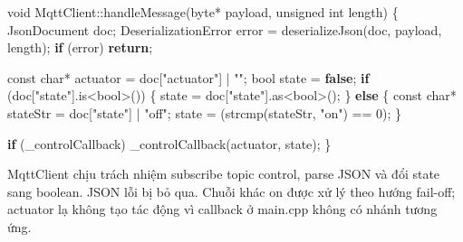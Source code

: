 \documentclass[11pt,oneside,openany]{book}
\renewcommand{\texttt}[1]{{\ttfamily\small #1}}
\newenvironment{Shaded}{\begin{snugshade}}{\end{snugshade}}
\newcommand{\AttributeTok}[1]{\textcolor[rgb]{0.16,0.50,0.73}{#1}}
\newcommand{\ControlFlowTok}[1]{\textcolor[rgb]{0.99,0.74,0.29}{\textbf{#1}}}
\newcommand{\DataTypeTok}[1]{\textcolor[rgb]{0.16,0.50,0.73}{#1}}
\newcommand{\DecValTok}[1]{\textcolor[rgb]{0.96,0.45,0.00}{#1}}
\newcommand{\KeywordTok}[1]{\textcolor[rgb]{0.81,0.81,0.76}{\textbf{#1}}}
\newcommand{\NormalTok}[1]{\textcolor[rgb]{0.81,0.81,0.76}{#1}}
\newcommand{\OperatorTok}[1]{\textcolor[rgb]{0.81,0.81,0.76}{#1}}
\newcommand{\StringTok}[1]{\textcolor[rgb]{0.96,0.31,0.31}{#1}}
\renewenvironment{Shaded}{%
  \def\FrameCommand{\fboxsep=8pt\colorbox{shadecolor}}%
  \MakeFramed{\advance\hsize-\width\FrameRestore}%
}{\endMakeFramed}
\begin{document}
\begin{Shaded}
\begin{Highlighting}[]
\DataTypeTok{void}\NormalTok{ MqttClient}\OperatorTok{::}\NormalTok{handleMessage}\OperatorTok{(}\NormalTok{byte}\OperatorTok{*}\NormalTok{ payload}\OperatorTok{,} \DataTypeTok{unsigned} \DataTypeTok{int}\NormalTok{ length}\OperatorTok{)} \OperatorTok{\{}
\NormalTok{  JsonDocument doc}\OperatorTok{;}
\NormalTok{  DeserializationError error }\OperatorTok{=}\NormalTok{ deserializeJson}\OperatorTok{(}\NormalTok{doc}\OperatorTok{,}\NormalTok{ payload}\OperatorTok{,}\NormalTok{ length}\OperatorTok{);}
  \ControlFlowTok{if} \OperatorTok{(}\NormalTok{error}\OperatorTok{)} \ControlFlowTok{return}\OperatorTok{;}

  \AttributeTok{const} \DataTypeTok{char}\OperatorTok{*}\NormalTok{ actuator }\OperatorTok{=}\NormalTok{ doc}\OperatorTok{[}\StringTok{"actuator"}\OperatorTok{]} \OperatorTok{|} \StringTok{""}\OperatorTok{;}
  \DataTypeTok{bool}\NormalTok{ state }\OperatorTok{=} \KeywordTok{false}\OperatorTok{;}
  \ControlFlowTok{if} \OperatorTok{(}\NormalTok{doc}\OperatorTok{[}\StringTok{"state"}\OperatorTok{].}\NormalTok{is}\OperatorTok{\textless{}}\DataTypeTok{bool}\OperatorTok{\textgreater{}())} \OperatorTok{\{}
\NormalTok{    state }\OperatorTok{=}\NormalTok{ doc}\OperatorTok{[}\StringTok{"state"}\OperatorTok{].}\NormalTok{as}\OperatorTok{\textless{}}\DataTypeTok{bool}\OperatorTok{\textgreater{}();}
  \OperatorTok{\}} \ControlFlowTok{else} \OperatorTok{\{}
    \AttributeTok{const} \DataTypeTok{char}\OperatorTok{*}\NormalTok{ stateStr }\OperatorTok{=}\NormalTok{ doc}\OperatorTok{[}\StringTok{"state"}\OperatorTok{]} \OperatorTok{|} \StringTok{"off"}\OperatorTok{;}
\NormalTok{    state }\OperatorTok{=} \OperatorTok{(}\NormalTok{strcmp}\OperatorTok{(}\NormalTok{stateStr}\OperatorTok{,} \StringTok{"on"}\OperatorTok{)} \OperatorTok{==} \DecValTok{0}\OperatorTok{);}
  \OperatorTok{\}}

  \ControlFlowTok{if} \OperatorTok{(}\NormalTok{\_controlCallback}\OperatorTok{)}\NormalTok{ \_controlCallback}\OperatorTok{(}\NormalTok{actuator}\OperatorTok{,}\NormalTok{ state}\OperatorTok{);}
\OperatorTok{\}}
\end{Highlighting}
\end{Shaded}

\texttt{MqttClient} chịu trách nhiệm subscribe topic control, parse JSON
và đổi state sang boolean. JSON lỗi bị bỏ qua. Chuỗi khác \texttt{on}
được xử lý theo hướng fail-off; actuator lạ không tạo tác động vì
callback ở \texttt{main.cpp} không có nhánh tương ứng.
\end{document}
